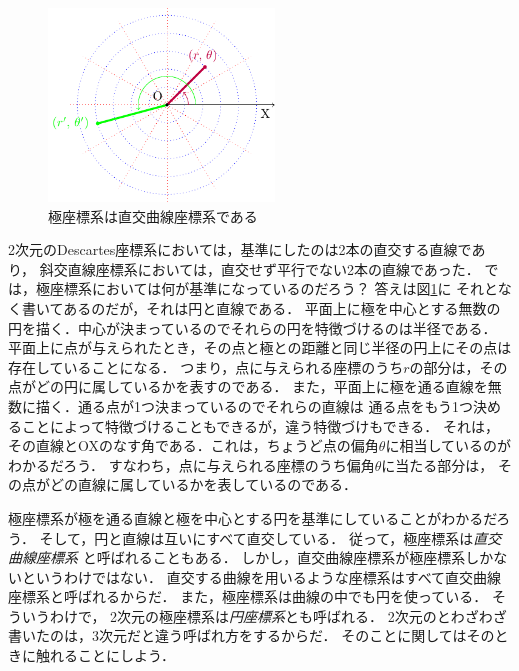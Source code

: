 \begin{figure}[h]
 \begin{center}
 \includegraphics[width=6cm]{picture/vecter11.pdf}
 \caption{極座標系は直交曲線座標系である}
\label{fig:kyokukyokusen}
 \end{center}
\end{figure}

2次元のDescartes座標系においては，基準にしたのは2本の直交する直線であり，
斜交直線座標系においては，直交せず平行でない2本の直線であった．
では，極座標系においては何が基準になっているのだろう？ 答えは図\ref{fig:kyokukyokusen}に
それとなく書いてあるのだが，それは円と直線である．
平面上に極を中心とする無数の円を描く．中心が決まっているのでそれらの円を特徴づけるのは半径である．
平面上に点が与えられたとき，その点と極との距離と同じ半径の円上にその点は存在していることになる．
つまり，点に与えられる座標のうち$r$の部分は，その点がどの円に属しているかを表すのである．
また，平面上に極を通る直線を無数に描く．通る点が1つ決まっているのでそれらの直線は
通る点をもう1つ決めることによって特徴づけることもできるが，違う特徴づけもできる．
それは，その直線とOXのなす角である．これは，ちょうど点の偏角$\theta$に相当しているのがわかるだろう．
すなわち，点に与えられる座標のうち偏角$\theta$に当たる部分は，
その点がどの直線に属しているかを表しているのである．

極座標系が極を通る直線と極を中心とする円を基準にしていることがわかるだろう．
そして，円と直線は互いにすべて直交している．
従って，極座標系は\emph{直交曲線座標系}
と呼ばれることもある．
しかし，直交曲線座標系が極座標系しかないというわけではない．
直交する曲線を用いるような座標系はすべて直交曲線座標系と呼ばれるからだ．
また，極座標系は曲線の中でも円を使っている．
そういうわけで，
2次元の極座標系は\emph{円座標系}とも呼ばれる．
2次元のとわざわざ書いたのは，3次元だと違う呼ばれ方をするからだ．
そのことに関してはそのときに触れることにしよう．


